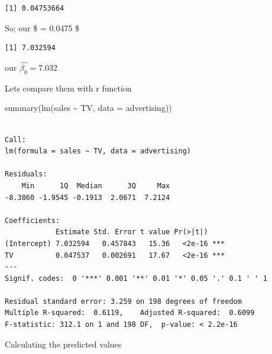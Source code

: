 \documentclass[
  letterpaper,
  DIV=11,
  numbers=noendperiod]{scrreprt}
\newenvironment{Shaded}{\begin{snugshade}}{\end{snugshade}}
\newcommand{\AttributeTok}[1]{\textcolor[rgb]{0.40,0.45,0.13}{#1}}
\newcommand{\DecValTok}[1]{\textcolor[rgb]{0.68,0.00,0.00}{#1}}
\newcommand{\FunctionTok}[1]{\textcolor[rgb]{0.28,0.35,0.67}{#1}}
\newcommand{\NormalTok}[1]{\textcolor[rgb]{0.00,0.23,0.31}{#1}}
\newcommand{\OtherTok}[1]{\textcolor[rgb]{0.00,0.23,0.31}{#1}}
\newcommand{\SpecialCharTok}[1]{\textcolor[rgb]{0.37,0.37,0.37}{#1}}
\begin{document}
\begin{verbatim}
[1] 0.04753664
\end{verbatim}

So; our \$ = 0.0475 \$

\begin{Shaded}
\end{Shaded}

\begin{verbatim}
[1] 7.032594
\end{verbatim}

our \(\hat{\beta_0} = 7.032\)

Lets compare them with r function

\begin{Shaded}
\begin{Highlighting}[]
\FunctionTok{summary}\NormalTok{(}\FunctionTok{lm}\NormalTok{(sales }\SpecialCharTok{\textasciitilde{}}\NormalTok{ TV, }\AttributeTok{data =}\NormalTok{ advertising))}
\end{Highlighting}
\end{Shaded}

\begin{verbatim}

Call:
lm(formula = sales ~ TV, data = advertising)

Residuals:
    Min      1Q  Median      3Q     Max 
-8.3860 -1.9545 -0.1913  2.0671  7.2124 

Coefficients:
            Estimate Std. Error t value Pr(>|t|)    
(Intercept) 7.032594   0.457843   15.36   <2e-16 ***
TV          0.047537   0.002691   17.67   <2e-16 ***
---
Signif. codes:  0 '***' 0.001 '**' 0.01 '*' 0.05 '.' 0.1 ' ' 1

Residual standard error: 3.259 on 198 degrees of freedom
Multiple R-squared:  0.6119,    Adjusted R-squared:  0.6099 
F-statistic: 312.1 on 1 and 198 DF,  p-value: < 2.2e-16
\end{verbatim}

Calculating the predicted values

\begin{Shaded}
\end{Shaded}
\end{document}
